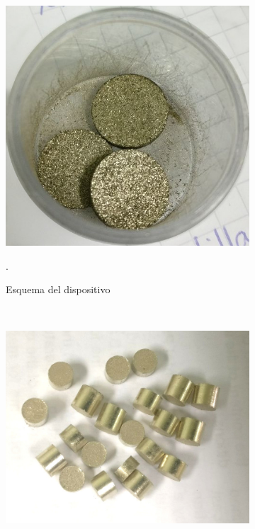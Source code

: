\documentclass[a4paper,12pt,fleqn,twoside,openany]{book}
\begin{document}
 \begin{figure}
    \centering
    \begin{subfigure}{0.3\textwidth}
        \includegraphics[width=\textwidth]{Img/Procedimiento/PastViruta.jpg}
	\caption{Esquema del dispositivo}. 
	\label{fig:CuatroPuntas}
    \end{subfigure}
    ~ %
    \begin{subfigure}{0.3\textwidth}
        \includegraphics[width=\textwidth]{Img/Procedimiento/PastMolienda.jpg}

\end{subfigure}
\end{figure}
\end{document}
